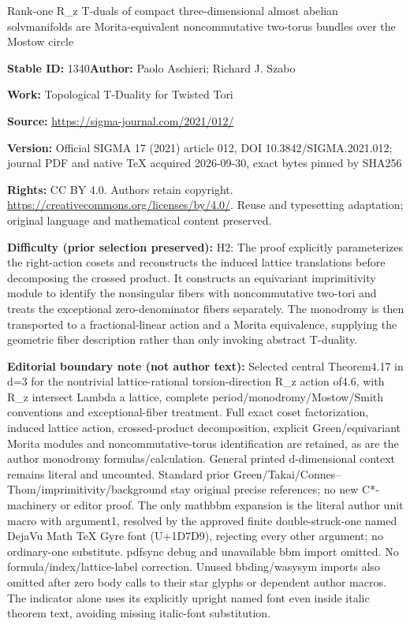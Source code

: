\documentclass[11pt]{article}
\numberwithin{equation}{section}
\numberwithin{equation}{section}
\begin{document}
\begin{center}\Large Rank-one R\_z T-duals of compact three-dimensional almost abelian solvmanifolds are Morita-equivalent noncommutative two-torus bundles over the Mostow circle\end{center}
\noindent\textbf{Stable ID:} 1340\quad\textbf{Author:} Paolo Aschieri; Richard J. Szabo\par
\noindent\textbf{Work:} Topological T-Duality for Twisted Tori\par
\noindent\textbf{Source:} \url{https://sigma-journal.com/2021/012/}\par
\noindent\textbf{Version:} Official SIGMA 17 (2021) article 012, DOI 10.3842/SIGMA.2021.012; journal PDF and native TeX acquired 2026-09-30, exact bytes pinned by SHA256\par
\noindent\textbf{Rights:} CC BY 4.0. Authors retain copyright. \url{https://creativecommons.org/licenses/by/4.0/}. Reuse and typesetting adaptation; original language and mathematical content preserved.\par
\noindent\textbf{Difficulty (prior selection preserved):} {\CJKfont H2: The proof explicitly parameterizes the right-action cosets and reconstructs the induced lattice translations before decomposing the crossed product. It constructs an equivariant imprimitivity module to identify the nonsingular fibers with noncommutative two-tori and treats the exceptional zero-denominator fibers separately. The monodromy is then transported to a fractional-linear action and a Morita equivalence, supplying the geometric fiber description rather than only invoking abstract T-duality.}\par
\medskip\noindent\textbf{Editorial boundary note (not author text):} Selected central Theorem4.17 in d=3 for the nontrivial lattice-rational torsion-direction R\_z action of4.6, with R\_z intersect Lambda a lattice, complete period/monodromy/Mostow/Smith conventions and exceptional-fiber treatment. Full exact coset factorization, induced lattice action, crossed-product decomposition, explicit Green/equivariant Morita modules and noncommutative-torus identification are retained, as are the author monodromy formulas/calculation. General printed d-dimensional context remains literal and uncounted. Standard prior Green/Takai/Connes–Thom/imprimitivity/background stay original precise references; no new C*-machinery or editor proof. The only mathbbm expansion is the literal author unit macro with argument1, resolved by the approved finite double-struck-one named DejaVu Math TeX Gyre font (U+1D7D9), rejecting every other argument; no ordinary-one substitute. pdfsync debug and unavailable bbm import omitted. No formula/index/lattice-label correction. Unused bbding/wasysym imports also omitted after zero body calls to their star glyphs or dependent author macros. The indicator alone uses its explicitly upright named font even inside italic theorem text, avoiding missing italic-font substitution.\par
\end{document}
